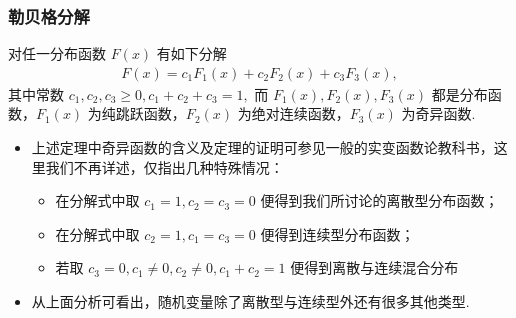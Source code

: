 \begin{frame}
	\frametitle{勒贝格分解}
	\begin{thm}[勒贝格分解] 对任一分布函数 $F (x)$ 有如下分解
		\begin{eqnarray*}
			F(x)=c_1F_1(x)+c_2F_2(x)+c_3F_3(x),
		\end{eqnarray*}
		其中常数 $c_1,c_2,c_3\ge 0, c_1+c_2+c_3=1,$ 而 $F_1 (x),F_2 (x),F_3 (x)$ 都是分布函数，$F_1 (x)$ 为纯跳跃函数，$F_2 (x)$ 为绝对连续函数，$F_3 (x)$ 为奇异函数.
	\end{thm}
	\vspace{0.3cm}
	\pause
	\begin{itemize}[<+-|alert@+>]
		\item 上述定理中奇异函数的含义及定理的证明可参见一般的实变函数论教科书，这里我们不再详述，仅指出几种特殊情况：
		      \begin{itemize}
			      \item 在分解式中取 $c_1=1,c_2=c_3=0$ 便得到我们所讨论的离散型分布函数；
			      \item 在分解式中取 $c_2=1,c_1=c_3=0$ 便得到连续型分布函数；
			      \item 若取 $c_3=0, c_1\neq 0, c_2\neq 0, c_1+c_2=1$ 便得到离散与连续混合分布
		      \end{itemize}
		\item 从上面分析可看出，随机变量除了离散型与连续型外还有很多其他类型.
	\end{itemize}

\end{frame}



